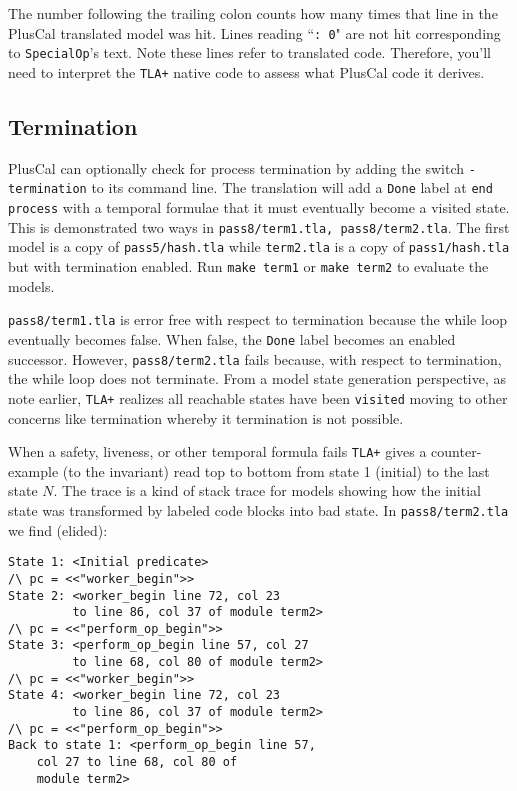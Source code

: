 \documentclass[twocolumn]{article}
\begin{document}
The number following the trailing colon counts how many times that line in the PlusCal translated model was hit. Lines reading ``\texttt{: 0}" are not hit corresponding to \texttt{SpecialOp}'s text. Note these lines refer to translated code. Therefore, you'll need to interpret the \texttt{TLA+} native code to assess what PlusCal code it derives. 

\subsection{Termination}
PlusCal can optionally check for process termination by adding the switch \texttt{-termination} to its command line. The translation will add a \texttt{Done} label at \texttt{end process} with a temporal formulae that it must eventually become a visited state. This is demonstrated two ways in \texttt{pass8/term1.tla, pass8/term2.tla}. The first model is a copy of \texttt{pass5/hash.tla} while \texttt{term2.tla} is a copy of \texttt{pass1/hash.tla} but with termination enabled. Run \texttt{make term1} or \texttt{make term2} to evaluate the models.

\texttt{pass8/term1.tla} is error free with respect to termination because the while loop eventually becomes false. When false, the \texttt{Done} label becomes an enabled successor. However, \texttt{pass8/term2.tla} fails because, with respect to termination, the while loop does not terminate. From a model state generation perspective, as note earlier, \texttt{TLA+} realizes all reachable states have been \texttt{visited} moving to other concerns like termination whereby it termination is not possible.

When a safety, liveness, or other temporal formula fails \texttt{TLA+} gives a counter-example (to the invariant) read top to bottom from state 1 (initial) to the last state $N$. The trace is a kind of stack trace for models showing how the initial state was transformed by labeled code blocks into bad state. In \texttt{pass8/term2.tla} we find (elided):

\begin{verbatim}
State 1: <Initial predicate>
/\ pc = <<"worker_begin">>
State 2: <worker_begin line 72, col 23 
         to line 86, col 37 of module term2>
/\ pc = <<"perform_op_begin">>
State 3: <perform_op_begin line 57, col 27
         to line 68, col 80 of module term2>
/\ pc = <<"worker_begin">>
State 4: <worker_begin line 72, col 23 
         to line 86, col 37 of module term2>
/\ pc = <<"perform_op_begin">>
Back to state 1: <perform_op_begin line 57, 
    col 27 to line 68, col 80 of 
    module term2>
\end{verbatim}
 
\end{document}
